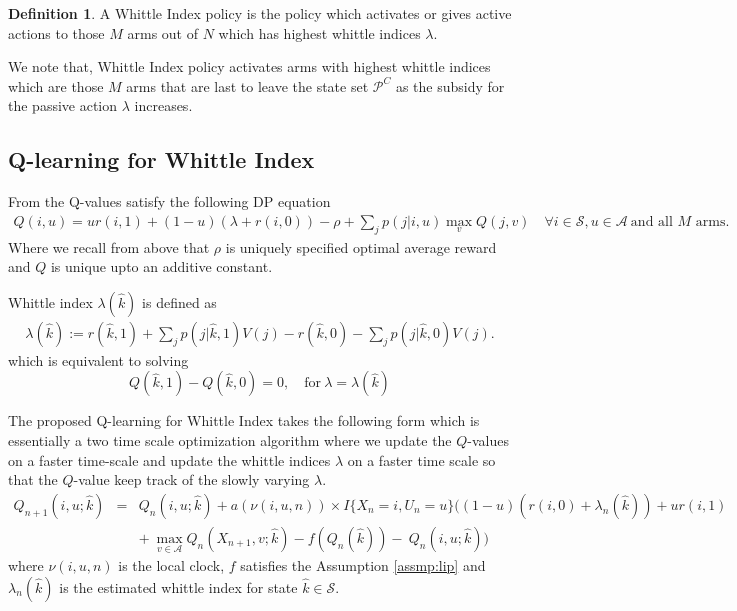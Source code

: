 \documentclass{article}
\theoremstyle{definition}
\newtheorem{definition}{Definition}[section]
\begin{document}
\begin{definition}
A Whittle Index policy is the policy which activates or gives active actions to those $M$ arms out of $N$ which has highest whittle indices $\lambda$.  
\end{definition}
We note that, Whittle Index policy activates arms with highest whittle indices which are those $M$ arms that are last to leave the state set $\mathcal{P}^C$ as the subsidy for the passive action $\lambda$ increases.

\subsection{Q-learning for Whittle Index}
From \cite{avrachenkov2021whittle} the Q-values satisfy the following DP equation
\begin{eqnarray}
Q(i,u) = ur(i,1) + (1-u)(\lambda + r(i,0)) - \rho + \sum_j p(j|i,u)\max_v Q(j,v) \quad \forall i \in \mathcal{S}, u \in \mathcal{A}\ \text{and all $M$ arms}.
\label{Q-DP}
\end{eqnarray}
Where we recall from above that $\rho$ is uniquely specified optimal average reward and $Q$ is unique upto an additive constant.

Whittle index $\lambda(\hat{k})$ is defined as 
\begin{eqnarray}
\lambda(\hat{k}) := r(\hat{k},1) + \sum_jp(j | \hat{k}, 1)V(j)
- r(\hat{k},0)-\sum_jp(j | \hat{k}, 0)V(j). \label{Windex0}
\end{eqnarray}
which is equivalent to solving
\begin{equation}
Q(\hat{k}, 1) - Q(\hat{k}, 0)=0,\quad  \text{for}\  \lambda = \lambda(\hat{k})\label{Windex}
\end{equation}

The proposed Q-learning for Whittle Index takes the following form which is essentially a two time scale optimization algorithm where we update the $Q$-values on a faster time-scale and update the whittle indices $\lambda$ on a faster time scale so that the $Q$-value keep track of the slowly varying $\lambda$. 
\begin{eqnarray}
Q_{n+1}(i,u;\hat{k}) &=& Q_n(i,u;\hat{k})  +  a(\nu(i,u,n)) \times I\{X_n = i, U_n = u\}\Big((1-u)(r(i,0) + \lambda_n(\hat{k})) +  ur(i,1)    \nonumber \\
&& + \ \max_{v\in\mathcal{A}}Q_n(X_{n+1},v;\hat{k})  - f(Q_n{(\hat{k})}) - \ Q_n(i,u;\hat{k})\Big) \label{Q-update0}
\end{eqnarray}
where $\nu(i,u,n)$ is the local clock, $f$ satisfies the Assumption \ref{assmp:lip} and $\lambda_n(\hat{k})$ is the estimated whittle index for state $\hat{k}\in\mathcal{S}$.\\
\end{document}
